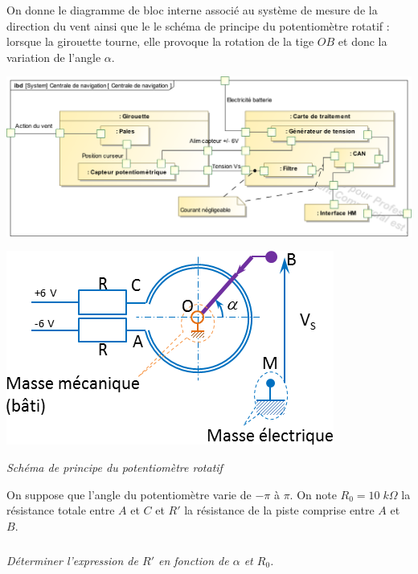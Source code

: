 \documentclass[10pt]{article}
\begin{document}
\vspace{.25cm}

On donne le diagramme de bloc interne associé au système de mesure de la direction du vent ainsi que le le schéma de principe du potentiomètre rotatif : lorsque la girouette tourne, elle provoque la rotation de la tige $OB$ et donc la variation de l'angle $\alpha$. 

\vspace{.25cm}

\begin{minipage}[c]{.55\linewidth}
\begin{center}
\includegraphics[width=\textwidth]{images/ibd}
\end{center}
\end{minipage}\hfill
\begin{minipage}[c]{.4\linewidth}
\begin{center}
\includegraphics[width=\textwidth]{images/capteur}

\textit{Schéma de principe du potentiomètre rotatif}
\end{center}
\end{minipage} 

\vspace{.25cm}

On suppose que l'angle du potentiomètre varie de $-\pi$ à $\pi$. On note $R_0= 10 \; k\Omega$ la résistance totale entre $A$ et $C$ et $R'$ la résistance de la piste comprise entre $A$ et $B$. 
\fi
\subparagraph{}
\textit{Déterminer l'expression de $R'$ en fonction de $\alpha$ et $R_0$. }
 
\end{document}
